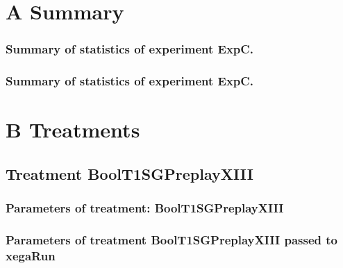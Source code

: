 \documentclass[18pt,c]{beamer}
\makeatletter
\def\beamer@writeslidentry@miniframesoff{%
  \expandafter\beamer@ifempty\expandafter{\beamer@framestartpage}{}%
  {%
   \clearpage\beamer@notesactions%
  }
}
\newcommand*{\miniframesoff}{\let\beamer@writeslidentry=\beamer@writeslidentry@miniframesoff}
\makeatother
\begin{document}
\section{A Summary}
 \begin{frame}
 \fontsize{8pt}{9pt}\selectfont
 \frametitle{ Summary of statistics of experiment ExpC. }

 \label{ExpCStatsTable005.tex}  
 \end{frame}

 \begin{frame}
 \fontsize{8pt}{9pt}\selectfont
 \frametitle{ Summary of statistics of experiment ExpC. }

 \label{ExpCStatsTable006.tex}  
 \end{frame}

\miniframesoff
\section{B Treatments}
\miniframesoff
\subsection{Treatment BoolT1SGPreplayXIII}

 \begin{frame}
 \fontsize{8pt}{9pt}\selectfont
 \frametitle{  Parameters of treatment: BoolT1SGPreplayXIII 
 }

 \label{ExpCtParmTable000.tex}  
 \end{frame}


 \begin{frame}
 \fontsize{8pt}{9pt}\selectfont
 \frametitle{  Parameters of treatment BoolT1SGPreplayXIII passed to xegaRun
 }

 \label{ExpCtParmTable001.tex}  
 \end{frame}

\end{document}
